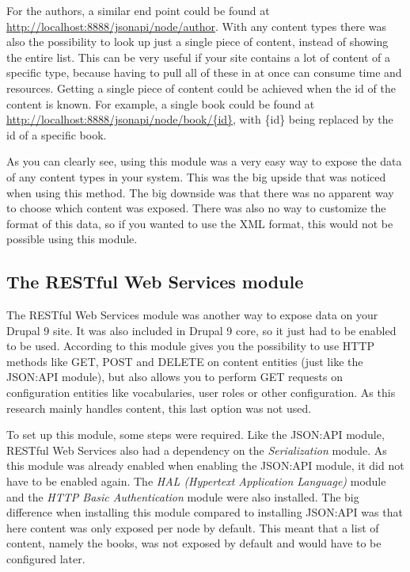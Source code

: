 For the authors, a similar end point could be found at \url{http://localhost:8888/jsonapi/node/author}. With any content types there was also the possibility to look up just a single piece of content, instead of showing the entire list. This can be very useful if your site contains a lot of content of a specific type, because having to pull all of these in at once can consume time and resources. Getting a single piece of content could be achieved when the id of the content is known. For example, a single book could be found at \url{http://localhost:8888/jsonapi/node/book/{id}}, with \{id\} being replaced by the id of a specific book.

As you can clearly see, using this module was a very easy way to expose the data of any content types in your system. This was the big upside that was noticed when using this method. The big downside was that there was no apparent way to choose which content was exposed. There was also no way to customize the format of this data, so if you wanted to use the XML format, this would not be possible using this module.


\subsection{The  RESTful Web Services module}

The RESTful Web Services module was another way to expose data on your Drupal 9 site. It was also included in Drupal 9 core, so it just had to be enabled to be used. According to \textcite{So2018} this module gives you the possibility to use HTTP methods like GET, POST and DELETE on content entities (just like the JSON:API module), but also allows you to perform GET requests on configuration entities like vocabularies, user roles or other configuration. As this research mainly handles content, this last option was not used.


To set up this module, some steps were required. Like the JSON:API module, RESTful Web Services also had a dependency on the \emph{Serialization} module. As this module was already enabled when enabling the JSON:API module, it did not have to be enabled again. The \emph{HAL (Hypertext Application Language)} module and the \emph{HTTP Basic Authentication} module were also installed. The big difference when installing this module compared to installing JSON:API was that here content was only exposed per node by default. This meant that a list of content, namely the books, was not exposed by default and would have to be configured later.

